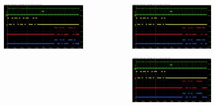 \documentclass[aspectratio=169]{beamer}
\begin{document}
\begin{frame}[noframenumbering]
\begin{columns}
\begin{center}
\begin{figure}
				\caption{}
			\end{figure}
			\begin{figure}
				\includegraphics[width=0.95 \textwidth]{IMG/probe/09-08-2021_ch05-read58-baselinedac1.png}
				\caption{}
			\end{figure}	
		\end{center}
		\begin{center}
			\begin{figure}
				\includegraphics[width=0.95 \textwidth]{IMG/probe/09-08-2021_ch05-read59-baselinedac1.png}
				\caption{}
			\end{figure}
			\begin{figure}
				\includegraphics[width=0.95 \textwidth]{IMG/probe/09-08-2021_ch05-read60-baselinedac1.png}
				\caption{}
			\end{figure}	
		\end{center}
	\end{columns}
		\end{frame}
	
\end{document}
